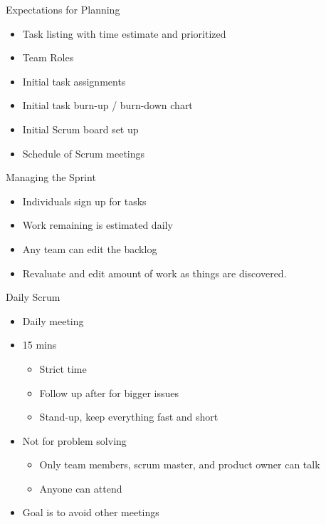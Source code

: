 \documentclass{report}
\begin{document}
\begin{description}
    \pagebreak
    \item Expectations for Planning

        \begin{itemize}
            \item Task listing with time estimate and prioritized
            \item Team Roles
            \item Initial task assignments
            \item Initial task burn-up / burn-down chart
            \item Initial Scrum board set up
            \item Schedule of Scrum meetings
        \end{itemize}


    \item Managing the Sprint
        \begin{itemize}
            \item Individuals sign up for tasks
            \item Work remaining is estimated daily
            \item Any team can edit the backlog
            \item Revaluate and edit amount of work as
                things are discovered.
        \end{itemize}

    \item Daily Scrum
        \begin{itemize}
            \item Daily meeting
            \item 15 mins
                \begin{itemize}
                    \item Strict time
                    \item Follow up after for bigger issues
                    \item Stand-up, keep everything fast and short
                \end{itemize}
            \item Not for problem solving
                \begin{itemize}
                    \item Only team members, scrum master, and
                        product owner can talk
                    \item Anyone can attend
                \end{itemize}
            \item Goal is to avoid other meetings
        \end{itemize}


\end{description}
\end{document}
